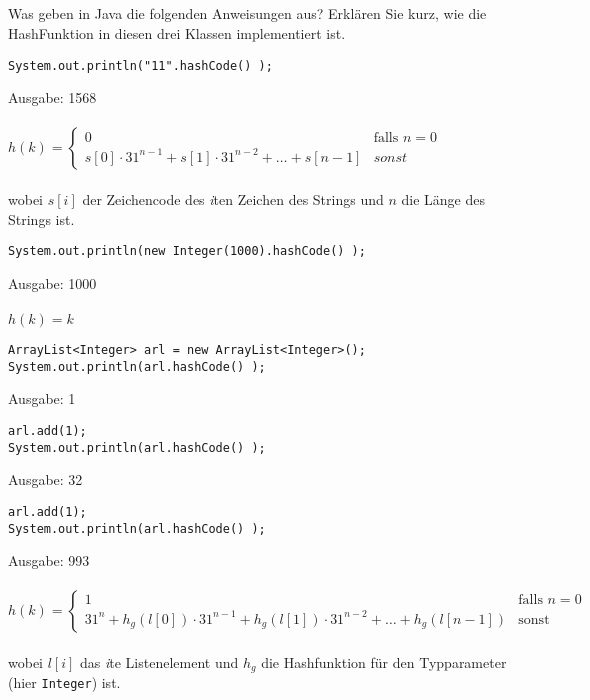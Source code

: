 \documentclass{article}
\begin{document}
\subsection{}
\lstset{language=Java}
Was geben in Java die folgenden Anweisungen aus? Erklären Sie kurz, wie die HashFunktion in diesen drei Klassen implementiert ist. \\
\begin{lstlisting}
System.out.println("11".hashCode() );
\end{lstlisting}
Ausgabe: 1568\\\\
$h(k) = \begin{cases} 0 &\text{falls } n = 0\\ s[0] \cdot 31^{n-1} + s[1] \cdot 31^{n-2} + \ldots + s[n-1] &sonst \end{cases}$ \\\\
wobei $s[i]$ der Zeichencode des \textit iten Zeichen des Strings und $n$ die Länge des Strings ist.\\
\begin{lstlisting}
System.out.println(new Integer(1000).hashCode() );
\end{lstlisting}
Ausgabe: 1000 \\\\
$h(k) = k$ \\
\begin{lstlisting}
ArrayList<Integer> arl = new ArrayList<Integer>();
System.out.println(arl.hashCode() );
\end{lstlisting}
Ausgabe: 1\\
\begin{lstlisting}
arl.add(1);
System.out.println(arl.hashCode() );
\end{lstlisting}
Ausgabe: 32\\
\begin{lstlisting}
arl.add(1);
System.out.println(arl.hashCode() );
\end{lstlisting}
Ausgabe: 993 \\\\
$h(k) = \begin{cases}1 & \text{falls } n = 0 \\31^{n} + h_g(l[0]) \cdot 31^{n-1} + h_g(l[1]) \cdot 31^{n-2} + \ldots + h_g(l[n-1])  &\text{sonst}\end{cases}$ \\\\
wobei $l[i]$ das \textit ite Listenelement und $h_g$ die Hashfunktion für den Typparameter (hier \lstinline {Integer}) ist.
\end{document}
